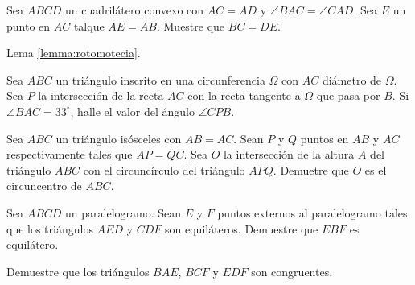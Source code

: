 \begin{problem}
Sea $ABCD$ un cuadrilátero convexo con
$AC = AD$ y $\angle BAC = \angle CAD$.
Sea $E$ un punto en $AC$ talque $AE = AB$.
Muestre que $BC = DE$.

\begin{hints}
	\begin{hint}
		Lema \ref{lemma:rotomotecia}.
	\end{hint}
\end{hints}
\end{problem}

\begin{problem}
Sea $ABC$ un triángulo inscrito en una circunferencia $\Omega$ con
$AC$ diámetro de $\Omega$. Sea $P$ la intersección de la recta $AC$ con
la recta tangente a $\Omega$ que pasa por $B$. Si $\angle BAC = 33^\circ$,
halle el valor del ángulo $\angle CPB$.
\end{problem}

\begin{problem}
Sea $ABC$ un triángulo isósceles con $AB = AC$. Sean $P$ y $Q$ puntos
en $AB$ y $AC$ respectivamente tales que $AP = QC$. Sea $O$
la intersección de la altura $A$ del triángulo $ABC$ con el
circuncírculo del triángulo $APQ$. Demuetre que $O$ es el
circuncentro de $ABC$.
\end{problem}


\begin{problem}
Sea $ABCD$ un paralelogramo. Sean $E$ y $F$ puntos externos al
paralelogramo tales que los triángulos $AED$ y $CDF$ son equiláteros.
Demuestre que $EBF$ es equilátero.

\begin{hints}
	\begin{hint}
		Demuestre que los triángulos $BAE$, $BCF$ y $EDF$ son congruentes.
	\end{hint}
\end{hints}
\end{problem}


